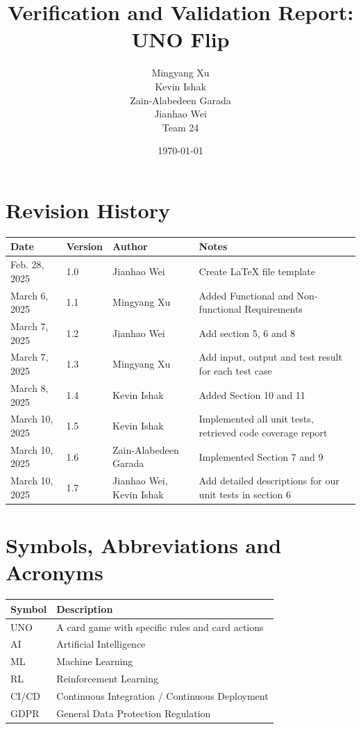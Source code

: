 \documentclass[12pt, titlepage]{article}
\begin{document}
\title{Verification and Validation Report: UNO Flip}
\author{Mingyang Xu\\ Kevin Ishak\\ Zain-Alabedeen Garada\\ Jianhao Wei\\ Team 24}

\date{\today}

\maketitle


\section{Revision History}

\begin{tabularx}{\textwidth}{p{3cm}p{1cm}p{3cm}X}
\toprule {\bf Date} & {\bf Version} & {\bf Author}& {\bf Notes}\\
\midrule
Feb. 28, 2025 & 1.0 & Jianhao Wei & Create LaTeX file template \\
March 6, 2025 & 1.1 & Mingyang Xu & Added Functional and Non-functional Requirements\\
March 7, 2025 & 1.2 & Jianhao Wei & Add section 5, 6 and 8\\
March 7, 2025 & 1.3 & Mingyang Xu & Add input, output and test result for each test case\\
March 8, 2025 & 1.4 & Kevin Ishak & Added Section 10 and 11\\
March 10, 2025 & 1.5 & Kevin Ishak & Implemented all unit tests, retrieved code coverage report\\
March 10, 2025 & 1.6 & Zain-Alabedeen Garada & Implemented Section 7 and 9\\
March 10, 2025 & 1.7 & Jianhao Wei, Kevin Ishak & Add detailed descriptions for our unit tests in section 6\\

\bottomrule
\end{tabularx}

\newpage

\section{Symbols, Abbreviations and Acronyms}

\renewcommand{\arraystretch}{1.2}
\begin{tabular}{l l} 
  \toprule		
  \textbf{Symbol} & \textbf{Description}\\
  \midrule 
  UNO & A card game with specific rules and card actions\\
  AI & Artificial Intelligence\\
  ML & Machine Learning\\
  RL & Reinforcement Learning\\
  CI/CD & Continuous Integration / Continuous Deployment\\
  GDPR & General Data Protection Regulation\\
  \bottomrule
\end{tabular}\
\end{document}
